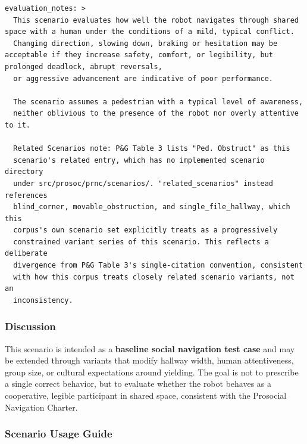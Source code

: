 \documentclass[utf8]{frontiers_suppmat} %
\begin{document}
\begin{lstlisting}[style=literatecard]
evaluation_notes: >
  This scenario evaluates how well the robot navigates through shared space with a human under the conditions of a mild, typical conflict.
  Changing direction, slowing down, braking or hesitation may be acceptable if they increase safety, comfort, or legibility, but  prolonged deadlock, abrupt reversals,
  or aggressive advancement are indicative of poor performance.

  The scenario assumes a pedestrian with a typical level of awareness,
  neither oblivious to the presence of the robot nor overly attentive to it.

  Related Scenarios note: P&G Table 3 lists "Ped. Obstruct" as this
  scenario's related entry, which has no implemented scenario directory
  under src/prosoc/prnc/scenarios/. "related_scenarios" instead references
  blind_corner, movable_obstruction, and single_file_hallway, which this
  corpus's own scenario set explicitly treats as a progressively
  constrained variant series of this scenario. This reflects a deliberate
  divergence from P&G Table 3's single-citation convention, consistent
  with how this corpus treats closely related scenario variants, not an
  inconsistency.
\end{lstlisting}

\subsubsection{Discussion}\label{discussion}

This scenario is intended as a \textbf{baseline social navigation test
case} and may be extended through variants that modify hallway width,
human attentiveness, group size, or cultural expectations around
yielding. The goal is not to prescribe a single correct behavior, but to
evaluate whether the robot behaves as a cooperative, legible participant
in shared space, consistent with the Prosocial Navigation Charter.

\subsubsection{Scenario Usage Guide}\label{scenario-usage-guide}
\end{document}
